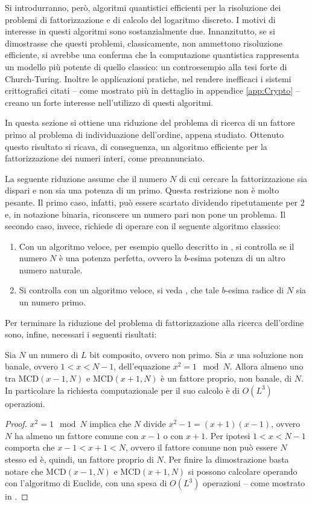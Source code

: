 Si introdurranno, però, algoritmi quantistici efficienti per la risoluzione dei problemi di fattorizzazione e di calcolo del logaritmo discreto.
I motivi di interesse in questi algoritmi sono sostanzialmente due.
Innanzitutto, se si dimostrasse che questi problemi, classicamente, non ammettono risoluzione efficiente, si avrebbe una conferma che la computazione quantistica rappresenta un modello più potente di quello classico: un controesempio alla tesi forte di Church-Turing.
Inoltre le applicazioni pratiche, nel rendere inefficaci i sistemi crittografici citati -- come mostrato più in dettaglio in appendice \ref{app:Crypto} -- creano un forte interesse nell'utilizzo di questi algoritmi.

In questa sezione si ottiene una riduzione del problema di ricerca di un fattore primo al problema di individuazione dell'ordine, appena studiato.
Ottenuto questo risultato si ricava, di conseguenza, un algoritmo efficiente per la fattorizzazione dei numeri interi, come preannunciato.

La seguente riduzione assume che il numero $N$ di cui cercare la fattorizzazione sia dispari e non sia una potenza di un primo.
Questa restrizione non è molto pesante.
Il primo caso, infatti, può essere scartato dividendo ripetutamente per $2$ e, in notazione binaria, riconscere un numero pari non pone un problema.
Il secondo caso, invece, richiede di operare con il seguente algoritmo classico:
\begin{enumerate}
 \item Con un algoritmo veloce, per esempio quello descritto in \cite{Article:PerfectPowers}, si controlla se il numero $N$ è una potenza perfetta, ovvero la $b$-esima potenza di un altro numero naturale.
 \item Si controlla con un algoritmo veloce, si veda \cite{Article:PRIMESinP}, che tale $b$-esima radice di $N$ sia un numero primo.
\end{enumerate}

Per terminare la riduzione del problema di fattorizzazione alla ricerca dell'ordine sono, infine, necessari i seguenti risultati:
\begin{thm}
 Sia $N$ un numero di $L$ bit composito, ovvero non primo. 
 Sia $x$ una soluzione non banale, ovvero $1 < x < N-1$, dell'equazione $x^2 = 1 \mod N$.
 Allora almeno uno tra MCD$(x-1,N)$ e MCD$(x+1,N)$ è un fattore proprio, non banale, di $N$.
 In particolare la richiesta computazionale per il suo calcolo è di $O(L^3)$ operazioni.
\end{thm}
\begin{proof}
 $x^2 = 1 \mod N$ implica che $N$ divide $x^2 - 1 = (x+1)(x-1)$, ovvero $N$ ha almeno un fattore comune con $x-1$ o con $x+1$.
 Per ipotesi $1 < x < N-1$ comporta che $x-1 < x+1 < N$, ovvero il fattore comune non può essere $N$ stesso ed è, quindi, un fattore proprio di $N$.
 Per finire la dimostrazione basta notare che MCD$(x-1,N)$ e MCD$(x+1,N)$ si possono calcolare operando con l'algoritmo di Euclide, con una spesa di $O(L^3)$ operazioni -- come mostrato in \cite{Book:Knuth_2}.
\end{proof}

